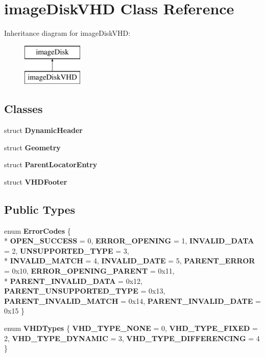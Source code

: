 \hypertarget{classimageDiskVHD}{\section{image\-Disk\-V\-H\-D Class Reference}
\label{classimageDiskVHD}
}
Inheritance diagram for image\-Disk\-V\-H\-D\-:\begin{figure}[H]
\begin{center}
\leavevmode
\includegraphics[height=2.000000cm]{classimageDiskVHD}
\end{center}
\end{figure}
\subsection*{Classes}
\begin{DoxyCompactItemize}
\item 
struct {\bfseries Dynamic\-Header}
\item 
struct {\bfseries Geometry}
\item 
struct {\bfseries Parent\-Locator\-Entry}
\item 
struct {\bfseries V\-H\-D\-Footer}
\end{DoxyCompactItemize}
\subsection*{Public Types}
\begin{DoxyCompactItemize}
\item 
enum {\bfseries Error\-Codes} \{ \\*
{\bfseries O\-P\-E\-N\-\_\-\-S\-U\-C\-C\-E\-S\-S} =  0, 
{\bfseries E\-R\-R\-O\-R\-\_\-\-O\-P\-E\-N\-I\-N\-G} =  1, 
{\bfseries I\-N\-V\-A\-L\-I\-D\-\_\-\-D\-A\-T\-A} =  2, 
{\bfseries U\-N\-S\-U\-P\-P\-O\-R\-T\-E\-D\-\_\-\-T\-Y\-P\-E} =  3, 
\\*
{\bfseries I\-N\-V\-A\-L\-I\-D\-\_\-\-M\-A\-T\-C\-H} =  4, 
{\bfseries I\-N\-V\-A\-L\-I\-D\-\_\-\-D\-A\-T\-E} =  5, 
{\bfseries P\-A\-R\-E\-N\-T\-\_\-\-E\-R\-R\-O\-R} =  0x10, 
{\bfseries E\-R\-R\-O\-R\-\_\-\-O\-P\-E\-N\-I\-N\-G\-\_\-\-P\-A\-R\-E\-N\-T} =  0x11, 
\\*
{\bfseries P\-A\-R\-E\-N\-T\-\_\-\-I\-N\-V\-A\-L\-I\-D\-\_\-\-D\-A\-T\-A} =  0x12, 
{\bfseries P\-A\-R\-E\-N\-T\-\_\-\-U\-N\-S\-U\-P\-P\-O\-R\-T\-E\-D\-\_\-\-T\-Y\-P\-E} =  0x13, 
{\bfseries P\-A\-R\-E\-N\-T\-\_\-\-I\-N\-V\-A\-L\-I\-D\-\_\-\-M\-A\-T\-C\-H} =  0x14, 
{\bfseries P\-A\-R\-E\-N\-T\-\_\-\-I\-N\-V\-A\-L\-I\-D\-\_\-\-D\-A\-T\-E} =  0x15
 \}
\item 
enum {\bfseries V\-H\-D\-Types} \{ {\bfseries V\-H\-D\-\_\-\-T\-Y\-P\-E\-\_\-\-N\-O\-N\-E} =  0, 
{\bfseries V\-H\-D\-\_\-\-T\-Y\-P\-E\-\_\-\-F\-I\-X\-E\-D} =  2, 
{\bfseries V\-H\-D\-\_\-\-T\-Y\-P\-E\-\_\-\-D\-Y\-N\-A\-M\-I\-C} =  3, 
{\bfseries V\-H\-D\-\_\-\-T\-Y\-P\-E\-\_\-\-D\-I\-F\-F\-E\-R\-E\-N\-C\-I\-N\-G} =  4
 \}
\end{DoxyCompactItemize}
